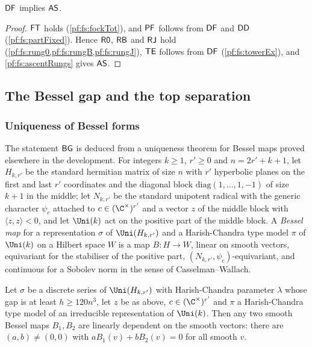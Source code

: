 \begin{theorem}[Ascent]\label{pf:fs:ascent}
$\mathsf{DF}$ implies $\mathsf{AS}$.
\end{theorem}

\begin{proof}
$\mathsf{FT}$ holds (\cref{pf:fs:fockTot}), and $\mathsf{PF}$ follows from $\mathsf{DF}$ and $\mathsf{DD}$ (\cref{pf:fs:partFixed}). Hence $\mathsf{R0}$, $\mathsf{RB}$ and
$\mathsf{RJ}$ hold (\cref{pf:fs:rung0,pf:fs:rungB,pf:fs:rungJ}), $\mathsf{TE}$ follows from $\mathsf{DF}$ (\cref{pf:fs:towerEx}), and \cref{pf:fs:ascentRungs} gives
$\mathsf{AS}$.
\end{proof}

\subsection{The Bessel gap and the top separation}\label{sec:pf:fs:bur}

\subsubsection{Uniqueness of Bessel forms}

The statement $\mathsf{BG}$ is deduced from a uniqueness theorem for Bessel maps proved elsewhere in the development. For integers
$k\ge1$, $r'\ge0$ and $n=2r'+k+1$, let $H_{k,r'}$ be the standard hermitian matrix of size $n$ with $r'$ hyperbolic planes on the
first and last $r'$ coordinates and the diagonal block $\mathrm{diag}(1,\dots,1,-1)$ of size $k+1$ in the middle; let $N_{k,r'}$ be the
standard unipotent radical with the generic character $\psi_{c}$ attached to $c\in(\C^\times)^{r'}$ and a vector $z$ of the middle block
with $\langle z,z\rangle<0$, and let $\Uni(k)$ act on the positive part of the middle block. A \emph{Bessel map} for a representation
$\sigma$ of $\Uni(H_{k,r'})$ and a Harish-Chandra type model $\pi$ of $\Uni(k)$ on a Hilbert space $W$ is a map $B\colon H\to W$, linear on
smooth vectors, equivariant for the stabiliser of the positive part, $(N_{k,r'},\psi_c)$-equivariant, and continuous for a Sobolev norm in
the sense of Casselman--Wallach.

\begin{littheorem}\label{pf:fs:bmu}
Let $\sigma$ be a discrete series of $\Uni(H_{k,r'})$ with Harish-Chandra parameter $\lambda$ whose gap is at least
$h\ge120n^3$, let $z$ be as above, $c\in(\C^\times)^{r'}$ and $\pi$ a Harish-Chandra type model of an
irreducible representation of $\Uni(k)$. Then any two smooth Bessel maps $B_1,B_2$ are linearly dependent on the smooth vectors: there are
$(a,b)\ne(0,0)$ with $aB_1(v)+bB_2(v)=0$ for all smooth $v$.
\end{littheorem}


